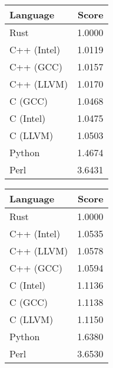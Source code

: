 \begin{subtable}{0.33\textwidth}
    \centering
    \caption{$k=1$}
    \label{table:runtime:regexp(1)}
    \begin{tabular}{|l|r|}
        \hline
        Language & Score \\
        \hline
        Rust & 1.0000 \\
        C++ (Intel) & 1.0119 \\
        C++ (GCC) & 1.0157 \\
        C++ (LLVM) & 1.0170 \\
        C (GCC) & 1.0468 \\
        C (Intel) & 1.0475 \\
        C (LLVM) & 1.0503 \\
        Python & 1.4674 \\
        Perl & 3.6431 \\
        \hline
    \end{tabular}
\end{subtable}%
\begin{subtable}{0.33\textwidth}
    \centering
    \caption{$k=2$}
    \label{table:runtime:regexp(2)}
    \begin{tabular}{|l|r|}
        \hline
        Language & Score \\
        \hline
        Rust & 1.0000 \\
        C++ (Intel) & 1.0535 \\
        C++ (LLVM) & 1.0578 \\
        C++ (GCC) & 1.0594 \\
        C (Intel) & 1.1136 \\
        C (GCC) & 1.1138 \\
        C (LLVM) & 1.1150 \\
        Python & 1.6380 \\
        Perl & 3.6530 \\
        \hline
    \end{tabular}
\end{subtable}%
